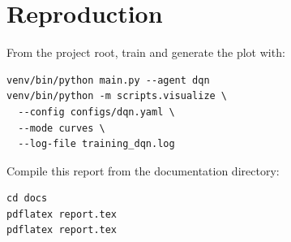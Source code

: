 \documentclass[11pt,a4paper]{article}
\begin{document}
\section*{Reproduction}

From the project root, train and generate the plot with:

\begin{verbatim}
venv/bin/python main.py --agent dqn
venv/bin/python -m scripts.visualize \
  --config configs/dqn.yaml \
  --mode curves \
  --log-file training_dqn.log
\end{verbatim}

Compile this report from the documentation directory:

\begin{verbatim}
cd docs
pdflatex report.tex
pdflatex report.tex
\end{verbatim}
\end{document}
